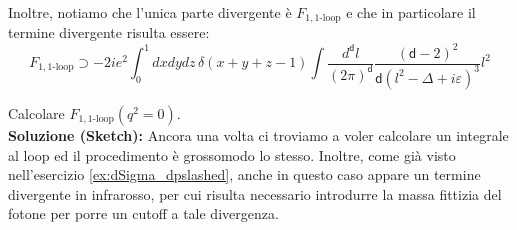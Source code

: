 \documentclass[../main.tex]{subfiles}
\begin{document}
Inoltre, notiamo che l'unica parte divergente è $F_{1,\text{1-loop}}$ e che in particolare il termine divergente risulta essere:
\[
 F_{1,\text{1-loop}}\supset -2ie^2\int_0^1 dxdydz \,\delta(x+y+z-1)\int \frac{d^\mathsf d l}{(2\pi)^\mathsf d}\frac{(\mathsf d-2)^2}{\mathsf d(l^2-\Delta+i\varepsilon)^3}l^2
\]

\begin{exercise}
    Calcolare $F_{1,\text{1-loop}}(q^2=0)$.\\
    \textbf{Soluzione (Sketch):} Ancora una volta ci troviamo a voler calcolare un integrale al loop ed il procedimento è grossomodo lo stesso. Inoltre, come già visto nell'esercizio \ref{ex:dSigma_dpslashed}, anche in questo caso appare un termine divergente in infrarosso, per cui risulta necessario introdurre la massa fittizia del fotone per porre un cutoff a tale divergenza. 
    

\end{exercise}
\end{document}
